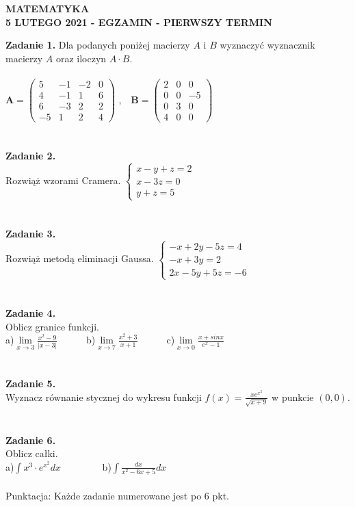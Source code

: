 \documentclass[12pt,a4paper]{report}
\begin{document}
\begin{center}

\textbf{MATEMATYKA \\5 LUTEGO 2021 - EGZAMIN - PIERWSZY TERMIN}

\end{center}\textbf{Zadanie 1.} Dla podanych poniżej macierzy $A$ i $B$ wyznaczyć wyznacznik macierzy $A$ oraz iloczyn $A\cdot B$. \\\\ $\mathbf{A} =\left( \begin{array}{cccc}5 & -1& -2 & 0\\4 & -1&1 & 6\\6 & -3& 2 & 2\\-5 & 1 & 2 & 4 \end{array} \right)$ ,\ \ $\mathbf{B} =\left( \begin{array}{ccc}2 & 0& 0\\0 & 0& -5\\0 & 3& 0\\4 & 0& 0\end{array} \right)$\\\\\\\textbf{Zadanie 2.}  \\Rozwiąż wzorami Cramera. $\left\{ \begin{array}{ll}x-y+z=2\\x-3z=0\\y+z=5\end{array}\right.$\\\\\\\textbf{Zadanie 3.}  \\Rozwiąż metodą eliminacji Gaussa. $\left\{ \begin{array}{ll}-x+2y-5z=4\\-x+3y=2\\2x-5y+5z=-6\end{array} \right.$\\\\\\\textbf{Zadanie 4.} \\Oblicz granice funkcji.\\a)$\lim\limits_{x\to 3}\frac{x^2-9}{\vert x-3\vert}$\ \ \ \ \ \  b)$\lim\limits_{x\to 7}\frac{x^2+3}{x+1}$\ \ \ \ \ \ c)$\lim\limits_{x\to 0} \frac{x+sinx}{e^x-1}$\\\\\\\textbf{Zadanie 5.} \\Wyznacz równanie stycznej do wykresu funkcji $f(x)=\frac{xe^{x^2}}{\sqrt{x+9}}$ w punkcie $(0,0)$.\\\\\\\textbf{Zadanie 6.} \\Oblicz całki. \\a)$\int x^3\cdot e^{x^2} dx$ \ \ \ \ \ \ \ \ b)$\int \frac{dx}{x^2-6x+5} dx$\\\\Punktacja: Każde zadanie numerowane jest po 6 pkt.
\end{document}
